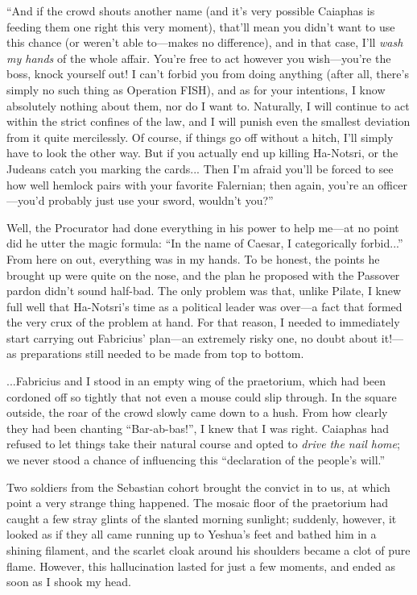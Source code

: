 ``And if the crowd shouts another name (and it's very possible Caiaphas is feeding them one right this very moment), that'll mean you didn't want to use this chance (or weren't able to---makes no difference), and in that case, I'll \emph{wash my hands} of the whole affair. You're free to act however you wish---you're the boss, knock yourself out! I can't forbid you from doing anything (after all, there's simply no such thing as Operation FISH), and as for your intentions, I know absolutely nothing about them, nor do I want to. Naturally, I will continue to act within the strict confines of the law, and I will punish even the smallest deviation from it quite mercilessly. Of course, if things go off without a hitch, I'll simply have to look the other way. But if you actually end up killing Ha-Notsri, or the Judeans catch you marking the cards... Then I'm afraid you'll be forced to see how well hemlock pairs with your favorite Falernian; then again, you're an officer---you'd probably just use your sword, wouldn't you?''

Well, the Procurator had done everything in his power to help me---at no point did he utter the magic formula: ``In the name of Caesar, I categorically forbid...'' From here on out, everything was in my hands. To be honest, the points he brought up were quite on the nose, and the plan he proposed with the Passover pardon didn't sound half-bad. The only problem was that, unlike Pilate, I knew full well that Ha-Notsri's time as a political leader was over---a fact that formed the very crux of the problem at hand. For that reason, I needed to immediately start carrying out Fabricius' plan---an extremely risky one, no doubt about it!---as preparations still needed to be made from top to bottom.

...Fabricius and I stood in an empty wing of the praetorium, which had been cordoned off so tightly that not even a mouse could slip through. In the square outside, the roar of the crowd slowly came down to a hush. From how clearly they had been chanting ``Bar-ab-bas!'', I knew that I was right. Caiaphas had refused to let things take their natural course and opted to \emph{drive the nail home}; we never stood a chance of influencing this ``declaration of the people's will.''

Two soldiers from the Sebastian cohort brought the convict in to us, at which point a very strange thing happened. The mosaic floor of the praetorium had caught a few stray glints of the slanted morning sunlight; suddenly, however, it looked as if they all came running up to Yeshua's feet and bathed him in a shining filament, and the scarlet cloak around his shoulders became a clot of pure flame. However, this hallucination lasted for just a few moments, and ended as soon as I shook my head.

